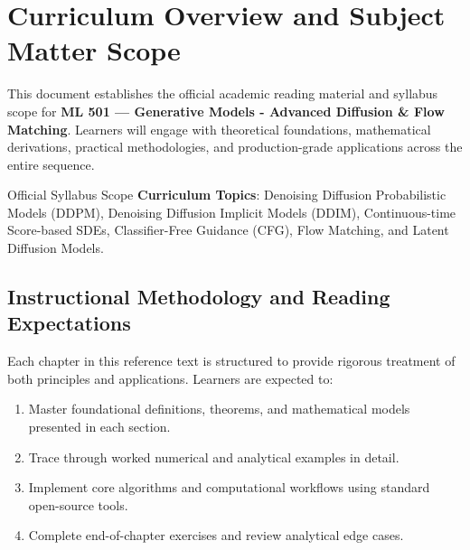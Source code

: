 \section{Curriculum Overview and Subject Matter Scope}

This document establishes the official academic reading material and syllabus scope for \textbf{ML 501 --- Generative Models - Advanced Diffusion \& Flow Matching}. Learners will engage with theoretical foundations, mathematical derivations, practical methodologies, and production-grade applications across the entire sequence.

\begin{InsightBox}{Official Syllabus Scope}
  \textbf{Curriculum Topics}: Denoising Diffusion Probabilistic Models (DDPM), Denoising Diffusion Implicit Models (DDIM), Continuous-time Score-based SDEs, Classifier-Free Guidance (CFG), Flow Matching, and Latent Diffusion Models.
\end{InsightBox}

\subsection{Instructional Methodology and Reading Expectations}

Each chapter in this reference text is structured to provide rigorous treatment of both principles and applications. Learners are expected to:
\begin{enumerate}
  \item Master foundational definitions, theorems, and mathematical models presented in each section.
  \item Trace through worked numerical and analytical examples in detail.
  \item Implement core algorithms and computational workflows using standard open-source tools.
  \item Complete end-of-chapter exercises and review analytical edge cases.
\end{enumerate}

